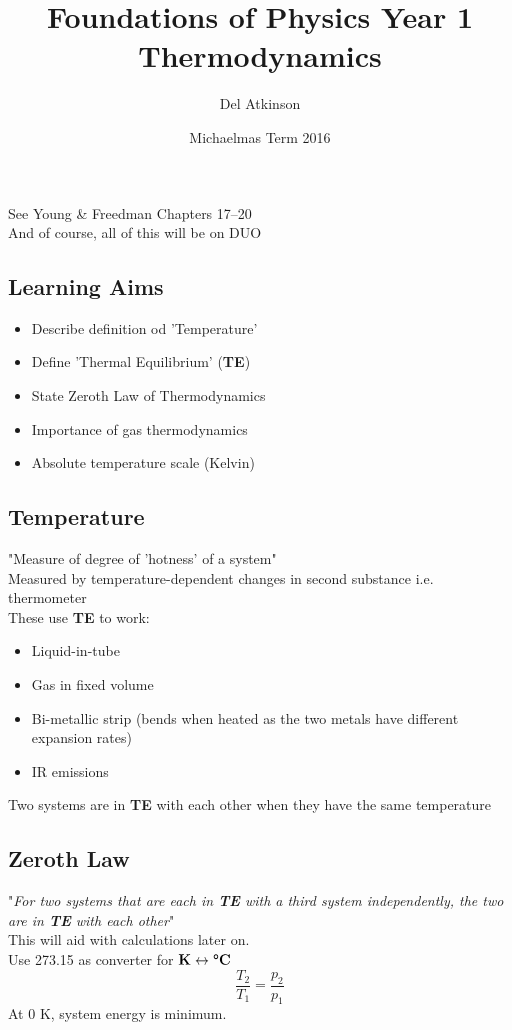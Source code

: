 \documentclass[a4paper, 11pt, fleqn, normalem]{report}
\title{Foundations of Physics Year 1 \\ Thermodynamics \vspace{-20pt}}
\author{Del Atkinson}
\date{\vspace{-15pt}Michaelmas Term 2016}
\begin{document}
\maketitle
\thispagestyle{fancy}

\tableofcontents

\chapter{}
See Young \& Freedman Chapters 17--20 \\
And of course, all of this will be on DUO
\section*{Learning Aims}
\begin{itemize}
    \item Describe definition od 'Temperature'
    \item Define 'Thermal Equilibrium' (\textbf{TE})
    \item State Zeroth Law of Thermodynamics
    \item Importance of gas thermodynamics
    \item Absolute temperature scale (Kelvin)
\end{itemize}

\section*{Temperature}
"Measure of degree of 'hotness' of a system" \\
Measured by temperature-dependent changes in second substance i.e. thermometer \\
These use \textbf{TE} to work:
\vspace{-8pt}
\begin{itemize}
    \item Liquid-in-tube
    \item Gas in fixed volume
    \item Bi-metallic strip (bends when heated as the two metals have different expansion rates)
    \item IR emissions
\end{itemize}
\vspace{-8pt}
Two systems are in \textbf{TE} with each other when they have the same temperature

\section*{Zeroth Law}
"\textit{For two systems that are each in \textbf{TE} with a third system independently, the two are in \textbf{TE} with each other}" \\
This will aid with calculations later on. \\
Use 273.15 as converter for $\textbf{K}\leftrightarrow\textbf{{\textdegree}C}$
\begin{equation*}
    \dfrac{T_{2}}{T_{1}} = \dfrac{p_{2}}{p_{1}}
\end{equation*}
At 0 K, system energy is minimum.
\end{document}
